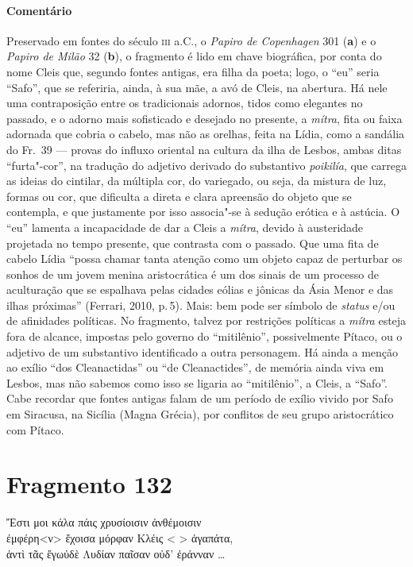{{\paragraph{Comentário} Preservado em fontes do século \textsc{iii} a.C., o \textit{Papiro de Copenhagen} 301 (\textbf{a}) e o \textit{Papiro de Milão} 32 (\textbf{b}),
o fragmento é lido em chave biográfica, por conta do
nome Cleis que, segundo fontes antigas, era filha da poeta; logo, o “eu” seria
``Safo”, que se referiria, ainda, à sua mãe, a avó de Cleis, na
abertura. Há nele uma contraposição entre os tradicionais adornos, tidos como
elegantes no passado, e o adorno mais sofisticado e desejado no presente, a
\textit{mítra}, fita ou faixa adornada que cobria o cabelo, mas não as orelhas,
feita na Lídia, como a sandália do Fr.~39 --- provas do influxo oriental na
cultura da ilha de Lesbos, ambas ditas ``furta"-cor”, na tradução do
adjetivo derivado do substantivo \textit{poikilía}, que carrega as ideias do
cintilar, da múltipla cor, do variegado, ou seja, da mistura de luz, formas ou
cor, que dificulta a direta e clara apreensão do objeto que se contempla, e que
justamente por isso associa"-se à sedução erótica e à astúcia. O “eu” lamenta a
incapacidade de dar a Cleis a \textit{mítra}, devido à austeridade projetada no tempo presente, que contrasta com o passado. Que uma fita de cabelo Lídia “possa chamar tanta atenção como um objeto capaz de perturbar os sonhos de um jovem menina aristocrática é um dos sinais de um processo de aculturação que se espalhava pelas cidades eólias e jônicas da Ásia Menor e das ilhas próximas” (Ferrari, 2010, p.\,5). Mais: bem pode ser símbolo de \textit{status} e/ou de afinidades políticas. No fragmento, talvez por restrições políticas a \textit{mítra} esteja fora de alcance,  impostas pelo governo do “mitilênio”, possivelmente
Pítaco, ou o adjetivo de um substantivo identificado a outra personagem. Há
ainda a menção ao exílio “dos Cleanactidas” ou “de Cleanactides”, de memória
ainda viva em Lesbos, mas não sabemos como isso se ligaria ao
“mitilênio”, a Cleis, a ``Safo”. Cabe recordar que fontes antigas falam
de um período de exílio vivido por Safo em Siracusa, na Sicília (Magna Grécia),
por conflitos de seu grupo aristocrático com Pítaco.}



\pagebreak
\section{Fragmento 132}

\begin{gkverse}
Ἔστι μοι κάλα πάις χρυσίοισιν ἀνθέμοισιν\\
ἐμφέρη<ν> ἔχοισα μόρφαν Κλέις <  > ἀγαπάτα,\\
ἀντὶ τᾶς ἔγωὐδὲ Λυδίαν παῖσαν οὐδ’ ἐράνναν \ldots{}
\end{gkverse}

}
